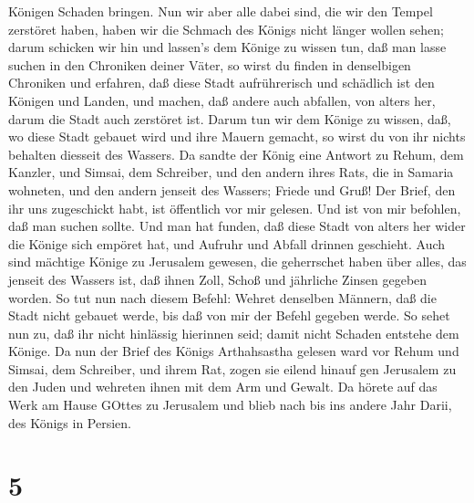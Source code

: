 Königen Schaden bringen.  Nun wir aber alle dabei sind, die
wir den Tempel zerstöret haben, haben wir die Schmach des Königs nicht
länger wollen sehen; darum schicken wir hin und lassen's dem Könige zu
wissen tun,  daß man lasse suchen in den Chroniken deiner
Väter, so wirst du finden in denselbigen Chroniken und erfahren, daß
diese Stadt aufrührerisch und schädlich ist den Königen und Landen, und
machen, daß andere auch abfallen, von alters her, darum die Stadt auch
zerstöret ist.  Darum tun wir dem Könige zu wissen, daß, wo
diese Stadt gebauet wird und ihre Mauern gemacht, so wirst du von ihr
nichts behalten diesseit des Wassers.  Da sandte der König
eine Antwort zu Rehum, dem Kanzler, und Simsai, dem Schreiber, und den
andern ihres Rats, die in Samaria wohneten, und den andern jenseit des
Wassers; Friede und Gruß!  Der Brief, den ihr uns
zugeschickt habt, ist öffentlich vor mir gelesen.  Und ist
von mir befohlen, daß man suchen sollte. Und man hat funden, daß diese
Stadt von alters her wider die Könige sich empöret hat, und Aufruhr und
Abfall drinnen geschieht.  Auch sind mächtige Könige zu
Jerusalem gewesen, die geherrschet haben über alles, das jenseit des
Wassers ist, daß ihnen Zoll, Schoß und jährliche Zinsen gegeben worden.
 So tut nun nach diesem Befehl: Wehret denselben Männern,
daß die Stadt nicht gebauet werde, bis daß von mir der Befehl gegeben
werde.  So sehet nun zu, daß ihr nicht hinlässig hierinnen
seid; damit nicht Schaden entstehe dem Könige.  Da nun der
Brief des Königs Arthahsastha gelesen ward vor Rehum und Simsai, dem
Schreiber, und ihrem Rat, zogen sie eilend hinauf gen Jerusalem zu den
Juden und wehreten ihnen mit dem Arm und Gewalt.  Da hörete
auf das Werk am Hause GOttes zu Jerusalem und blieb nach bis ins andere
Jahr Darii, des Königs in Persien.

\hypertarget{section-4}{%
\section{5}\label{section-4}}

